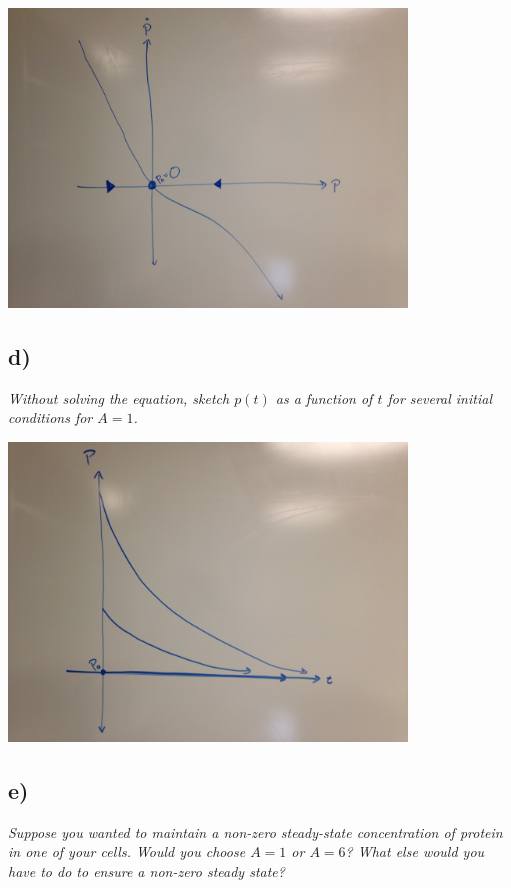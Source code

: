\documentclass[12pt]{article}
\begin{document}
\begin{center}
	\includegraphics[width=400px]{figures/4_c.jpg}
\end{center}

\subsection*{ d)}
{\it Without solving the equation, sketch $p(t)$ as a function of $t$ for several initial conditions for $A = 1$.} 

\begin{center}
	\includegraphics[width=400px]{figures/4_d.jpg}
\end{center}

\subsection*{ e)}
{\it Suppose you wanted to maintain a non-zero steady-state concentration of protein in one of your cells.  Would you choose $A = 1$ or $A = 6$?  What else would you have to do to ensure a non-zero steady state?} \\
\end{document}
